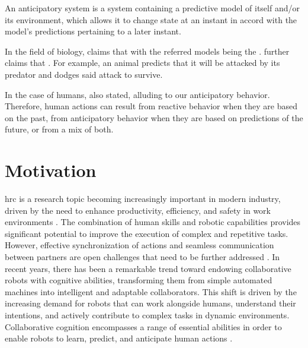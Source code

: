 \begin{displayquote}
An anticipatory system is a system containing a predictive model of itself and/or its environment, which allows it to change state at an instant in accord with the model's predictions pertaining to a later instant.
\end{displayquote}

In the field of biology, \textcite{Louie2010} claims that  with the referred models being the . \textcite{Poli2010} further claims that . For example, an animal predicts that it will be attacked by its predator and dodges said attack to survive.

In the case of humans, \textcite{Louie2010} also stated,  alluding to our anticipatory behavior. Therefore, human actions can result from reactive behavior when they are based on the past, from anticipatory behavior when they are based on predictions of the future, or from a mix of both.


\section{Motivation}

\acl{hrc} is a research topic becoming increasingly important in modern industry, driven by the need to enhance productivity, efficiency, and safety in work environments \cite{RoblaGomez2017,Villani2018,Ajoudani2018,Matheson2019,Kumar2021,Castro2021}. The combination of human skills and robotic capabilities provides significant potential to improve the execution of complex and repetitive tasks. However, effective synchronization of actions and seamless communication between partners are open challenges that need to be further addressed \cite{Michalos2018,Papanastasiou2019,Hoffman2019}. In recent years, there has been a remarkable trend toward endowing collaborative robots with cognitive abilities, transforming them from simple automated machines into intelligent and adaptable collaborators. This shift is driven by the increasing demand for robots that can work alongside humans, understand their intentions, and actively contribute to complex tasks in dynamic environments. Collaborative cognition encompasses a range of essential abilities in order to enable robots to learn, predict, and anticipate human actions \cite{Rozo2018,Jiao2020,Castro2021}. 

